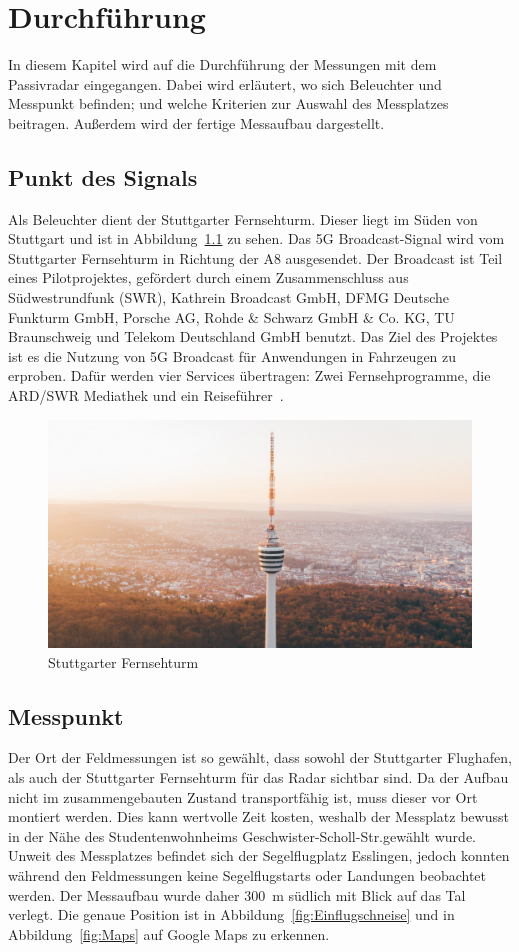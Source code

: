 \chapter{Durchführung}
In diesem Kapitel wird auf die Durchführung der Messungen mit dem Passivradar eingegangen. Dabei wird erläutert, wo sich Beleuchter und Messpunkt befinden; und welche Kriterien zur Auswahl des Messplatzes beitragen. Außerdem wird der fertige Messaufbau dargestellt.
\section{Punkt des Signals}
Als Beleuchter dient der Stuttgarter Fernsehturm. Dieser liegt im Süden von Stuttgart und ist in Abbildung~\ref{fig:Fernsehturm} zu sehen. Das 5G Broadcast-Signal wird vom Stuttgarter Fernsehturm in Richtung der A8 ausgesendet. Der Broadcast ist Teil eines Pilotprojektes, gefördert durch einem Zusammenschluss aus Südwestrundfunk (SWR), Kathrein Broadcast GmbH,  DFMG  Deutsche Funkturm GmbH, Porsche AG, Rohde \& Schwarz GmbH \& Co. KG, TU Braunschweig und Telekom Deutschland GmbH benutzt. Das Ziel des Projektes ist es die Nutzung von 5G Broadcast für Anwendungen in Fahrzeugen zu erproben. Dafür werden vier Services übertragen: Zwei Fernsehprogramme, die ARD/SWR Mediathek und ein Reiseführer~\cite{5GMAG2020}.
\begin{figure}
    \centering
    \includegraphics[width=\textwidth]{images/Fernsehturm.jpg}
    \caption{Stuttgarter Fernsehturm}\label{fig:Fernsehturm}
\end{figure}

\section{Messpunkt}
Der Ort der Feldmessungen ist so gewählt, dass sowohl der Stuttgarter Flughafen, als auch der Stuttgarter Fernsehturm für das Radar sichtbar sind. Da der Aufbau nicht im zusammengebauten Zustand transportfähig ist, muss dieser vor Ort montiert werden. Dies kann wertvolle Zeit kosten, weshalb der Messplatz bewusst in der Nähe des Studentenwohnheims Geschwister-Scholl-Str.\@ gewählt wurde. Unweit des Messplatzes befindet sich der Segelflugplatz Esslingen, jedoch konnten während den Feldmessungen keine Segelflugstarts oder Landungen beobachtet werden. Der Messaufbau wurde daher \SI{300}{\metre} südlich mit Blick auf das Tal verlegt. Die genaue Position ist in Abbildung~\ref{fig:Einflugschneise} und in Abbildung~\ref{fig:Maps} auf Google Maps zu erkennen.

